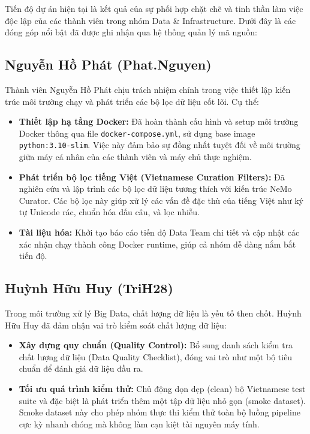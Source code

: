 ﻿\documentclass[12pt,a4paper]{article}
\begin{document}
Tiến độ dự án hiện tại là kết quả của sự phối hợp chặt chẽ và tinh thần làm việc độc lập của các thành viên trong nhóm Data \& Infrastructure. Dưới đây là các đóng góp nổi bật đã được ghi nhận qua hệ thống quản lý mã nguồn:

\subsection{Nguyễn Hồ Phát (Phat.Nguyen)}
Thành viên Nguyễn Hồ Phát chịu trách nhiệm chính trong việc thiết lập kiến trúc môi trường chạy và phát triển các bộ lọc dữ liệu cốt lõi. Cụ thể:
\begin{itemize}
    \item \textbf{Thiết lập hạ tầng Docker:} Đã hoàn thành cấu hình và setup môi trường Docker thông qua file \texttt{docker-compose.yml}, sử dụng base image \texttt{python:3.10-slim}. Việc này đảm bảo sự đồng nhất tuyệt đối về môi trường giữa máy cá nhân của các thành viên và máy chủ thực nghiệm.
    \item \textbf{Phát triển bộ lọc tiếng Việt (Vietnamese Curation Filters):} Đã nghiên cứu và lập trình các bộ lọc dữ liệu tương thích với kiến trúc NeMo Curator. Các bộ lọc này giúp xử lý các vấn đề đặc thù của tiếng Việt như ký tự Unicode rác, chuẩn hóa dấu câu, và lọc nhiễu.
    \item \textbf{Tài liệu hóa:} Khởi tạo báo cáo tiến độ Data Team chi tiết và cập nhật các xác nhận chạy thành công Docker runtime, giúp cả nhóm dễ dàng nắm bắt tiến độ.
\end{itemize}

\subsection{Huỳnh Hữu Huy (TriH28)}
Trong môi trường xử lý Big Data, chất lượng dữ liệu là yếu tố then chốt. Huỳnh Hữu Huy đã đảm nhận vai trò kiểm soát chất lượng dữ liệu:
\begin{itemize}
    \item \textbf{Xây dựng quy chuẩn (Quality Control):} Bổ sung danh sách kiểm tra chất lượng dữ liệu (Data Quality Checklist), đóng vai trò như một bộ tiêu chuẩn để đánh giá dữ liệu đầu ra.
    \item \textbf{Tối ưu quá trình kiểm thử:} Chủ động dọn dẹp (clean) bộ Vietnamese test suite và đặc biệt là phát triển thêm một tập dữ liệu nhỏ gọn (smoke dataset). Smoke dataset này cho phép nhóm thực thi kiểm thử toàn bộ luồng pipeline cực kỳ nhanh chóng mà không làm cạn kiệt tài nguyên máy tính.
\end{itemize}
\end{document}
